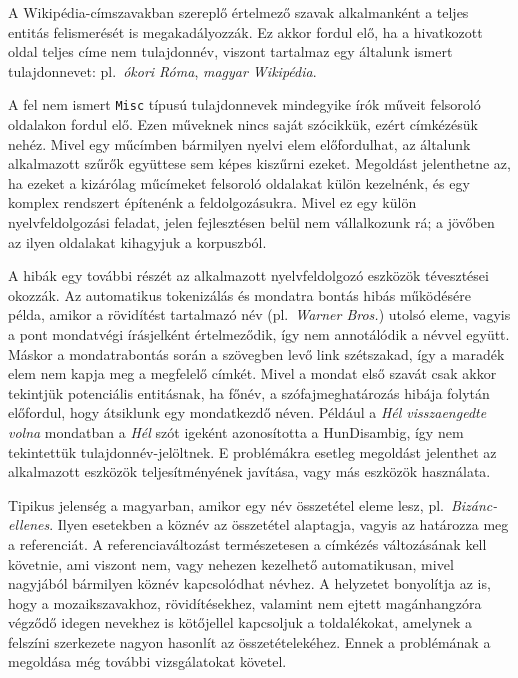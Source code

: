 \documentclass{llncs}
\begin{document}
A Wikipédia-címszavakban szereplő értelmező szavak alkalmanként a teljes entitás
felismerését is megakadályozzák. Ez akkor fordul elő, ha a hivatkozott oldal
teljes címe nem tulajdonnév, viszont tartalmaz egy általunk ismert tulajdonnevet:
pl.~\textit{ókori Róma}, \textit{magyar Wikipédia}. 

A fel nem ismert \texttt{Misc} típusú tulajdonnevek mindegyike
írók műveit felsoroló oldalakon fordul elő. Ezen műveknek nincs saját szócikkük,
ezért címkézésük nehéz. Mivel egy műcímben bármilyen nyelvi elem előfordulhat,
az általunk alkalmazott szűrők együttese sem képes kiszűrni ezeket. Megoldást
jelenthetne az, ha ezeket a kizárólag műcímeket felsoroló oldalakat külön kezelnénk,
és egy komplex rendszert építenénk a feldolgozásukra. Mivel ez egy külön
nyelvfeldolgozási feladat, jelen fejlesztésen belül nem vállalkozunk rá;
a jövőben az ilyen oldalakat kihagyjuk a korpuszból.

A hibák egy további részét az alkalmazott nyelvfeldolgozó eszközök tévesztései okozzák.
Az automatikus tokenizálás és mondatra bontás hibás működésére példa, amikor a
rövidítést tartalmazó név (pl.~\textit{Warner Bros.}) utolsó eleme, vagyis a pont
mondatvégi írásjelként értelmeződik, így nem annotálódik a névvel együtt. Máskor
a mondatrabontás során a szövegben levő link szétszakad, így a maradék elem nem
kapja meg a megfelelő címkét. Mivel a mondat első szavát csak akkor tekintjük
potenciális entitásnak, ha főnév, a szófajmeghatározás hibája folytán előfordul,
hogy átsiklunk egy mondatkezdő néven. Például a \textit{Hél visszaengedte volna}
mondatban a \textit{Hél} szót igeként azonosította a HunDisambig, így nem
tekintettük tulajdonnév-jelöltnek. E problémákra esetleg megoldást jelenthet az
alkalmazott eszközök teljesítményének javítása, vagy más eszközök használata.

Tipikus jelenség a magyarban, amikor egy név összetétel eleme lesz,
pl.~\textit{Bizánc-ellenes}. Ilyen esetekben a köznév az összetétel alaptagja,
vagyis az határozza meg a referenciát. A referenciaváltozást természetesen a
címkézés változásának kell követnie, ami viszont nem, vagy nehezen kezelhető
automatikusan, mivel nagyjából bármilyen köznév kapcsolódhat névhez. A helyzetet
bonyolítja az is, hogy a mozaikszavakhoz, rövidítésekhez, valamint nem ejtett
magánhangzóra végződő idegen nevekhez is kötőjellel kapcsoljuk a toldalékokat,
amelynek a felszíni szerkezete nagyon hasonlít az összetételekéhez. Ennek a
problémának a megoldása még további vizsgálatokat követel. 
\end{document}

